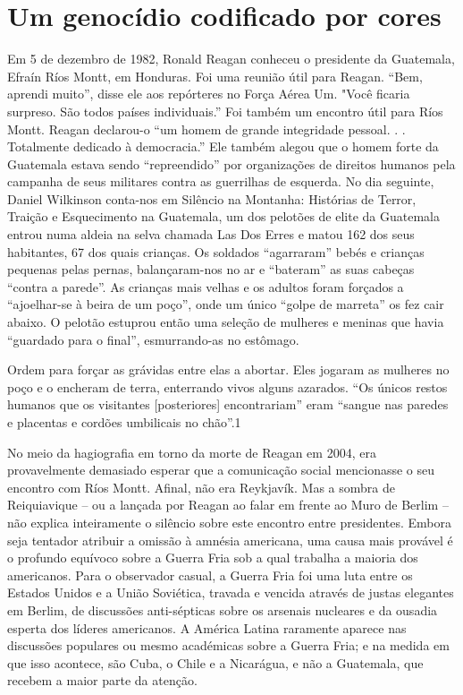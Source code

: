 \chapter{Um genocídio codificado por cores}\label{Um genocídio codificado por cores}
 \par 
Em {\color{blue}5} de dezembro de 1982, Ronald Reagan conheceu o presidente da Guatemala, Efraín Ríos Montt, em Honduras. Foi uma reunião útil para Reagan. “Bem, aprendi muito”, disse ele aos repórteres no Força Aérea Um. "Você ficaria surpreso. São todos países individuais.” Foi também um encontro útil para Ríos Montt. Reagan declarou-o “um homem de grande integridade pessoal. . . Totalmente dedicado à democracia.” Ele também alegou que o homem forte da Guatemala estava sendo “repreendido” por organizações de direitos humanos pela campanha de seus militares contra as guerrilhas de esquerda. No dia seguinte, Daniel Wilkinson conta-nos em Silêncio na Montanha: Histórias de Terror, Traição e Esquecimento na Guatemala, um dos pelotões de elite da Guatemala entrou numa aldeia na selva chamada Las Dos Erres e matou {\color{blue}162} dos seus habitantes, {\color{blue}67} dos quais crianças. Os soldados “agarraram” bebés e crianças pequenas pelas pernas, balançaram-nos no ar e “bateram” as suas cabeças “contra a parede”. As crianças mais velhas e os adultos foram forçados a “ajoelhar-se à beira de um poço”, onde um único “golpe de marreta” os fez cair abaixo. O pelotão estuprou então uma seleção de mulheres e meninas que havia “guardado para o final”, esmurrando-as no estômago.
 \par 
Ordem para forçar as grávidas entre elas a abortar. Eles jogaram as mulheres no poço e o encheram de terra, enterrando vivos alguns azarados. “Os únicos restos humanos que os visitantes [posteriores] encontrariam” eram “sangue nas paredes e placentas e cordões umbilicais no chão”.{\color{blue}1}
 \par 
No meio da hagiografia em torno da morte de Reagan em 2004, era provavelmente demasiado esperar que a comunicação social mencionasse o seu encontro com Ríos Montt. Afinal, não era Reykjavík. Mas a sombra de Reiquiavique – ou a lançada por Reagan ao falar em frente ao Muro de Berlim – não explica inteiramente o silêncio sobre este encontro entre presidentes. Embora seja tentador atribuir a omissão à amnésia americana, uma causa mais provável é o profundo equívoco sobre a Guerra Fria sob a qual trabalha a maioria dos americanos. Para o observador casual, a Guerra Fria foi uma luta entre os Estados Unidos e a União Soviética, travada e vencida através de justas elegantes em Berlim, de discussões anti-sépticas sobre os arsenais nucleares e da ousadia esperta dos líderes americanos. A América Latina raramente aparece nas discussões populares ou mesmo académicas sobre a Guerra Fria; e na medida em que isso acontece, são Cuba, o Chile e a Nicarágua, e não a Guatemala, que recebem a maior parte da atenção.
